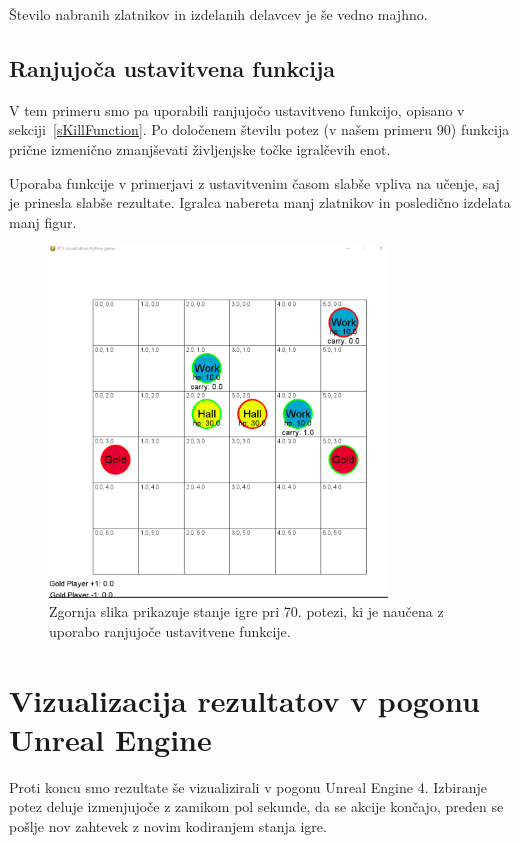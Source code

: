 \documentclass[a4paper, 12pt]{book}
\begin{document}
Število nabranih zlatnikov in izdelanih delavcev je še vedno majhno.

\subsection{Ranjujoča ustavitvena funkcija}

V tem primeru smo pa uporabili ranjujočo ustavitveno funkcijo, opisano v sekciji~\ref{sKillFunction}.
Po določenem številu potez (v našem primeru 90) funkcija prične izmenično zmanjševati življenjske točke igralčevih enot.

Uporaba funkcije v primerjavi z ustavitvenim časom slabše vpliva na učenje, saj je prinesla slabše rezultate.
Igralca nabereta manj zlatnikov in posledično izdelata manj figur.



\begin{figure}[h]
	\begin{center}
		\includegraphics[width=0.8\textwidth]{photos/killFunction.pdf}
	\end{center}
	\caption{Zgornja slika prikazuje stanje igre pri 70. potezi, ki je naučena z uporabo ranjujoče ustavitvene funkcije.}
	\label{vizualizacijaRezultatovKillFunction}
\end{figure}

\section{Vizualizacija rezultatov v pogonu Unreal Engine}
Proti koncu smo rezultate še vizualizirali v pogonu Unreal Engine 4.
Izbiranje potez deluje izmenjujoče z zamikom pol sekunde, da se akcije končajo, preden se pošlje nov zahtevek z novim kodiranjem stanja igre.
\end{document}
